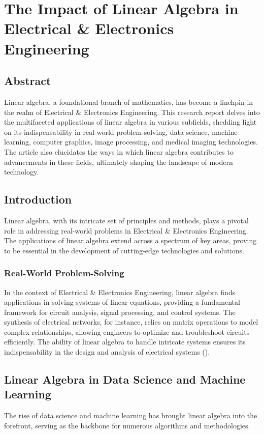 \chapter{The Impact of Linear Algebra in Electrical \& Electronics Engineering}

\section{Abstract}
Linear algebra, a foundational branch of mathematics, has become a linchpin in the realm of Electrical \& Electronics Engineering. This research report delves into the multifaceted applications of linear algebra in various subfields, shedding light on its indispensability in real-world problem-solving, data science, machine learning, computer graphics, image processing, and medical imaging technologies. The article also elucidates the ways in which linear algebra contributes to advancements in these fields, ultimately shaping the landscape of modern technology.

\section{Introduction}
Linear algebra, with its intricate set of principles and methods, plays a pivotal role in addressing real-world problems in Electrical \& Electronics Engineering. The applications of linear algebra extend across a spectrum of key areas, proving to be essential in the development of cutting-edge technologies and solutions.

\newpage
\thispagestyle{plain}

\subsection{Real-World Problem-Solving}
In the context of Electrical \& Electronics Engineering, linear algebra finds applications in solving systems of linear equations, providing a fundamental framework for circuit analysis, signal processing, and control systems. The synthesis of electrical networks, for instance, relies on matrix operations to model complex relationships, allowing engineers to optimize and troubleshoot circuits efficiently. The ability of linear algebra to handle intricate systems ensures its indispensability in the design and analysis of electrical systems (\cite{smith_brown_2018}).

\section{Linear Algebra in Data Science and Machine Learning}
The rise of data science and machine learning has brought linear algebra into the forefront, serving as the backbone for numerous algorithms and methodologies.

